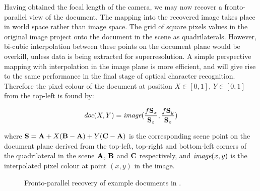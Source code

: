Having obtained the focal length of the camera, we may now recover a fronto-parallel view of the document.  The mapping into the recovered image takes place in world space rather than image space.
The grid of square pixels values in the original image project onto the document in the scene as quadrilaterals.
However, bi-cubic interpolation between these points on the document plane would be overkill,
unless data is being extracted for superresolution.
A simple perspective mapping with interpolation in the image plane is more efficient, and
will give rise to the same performance in the final stage of optical character recognition.
Therefore the pixel colour of the document at position $X \in [0,1]$, $Y \in [0,1]$ from the top-left is found by:

\begin{equation}
\mbox{\em doc}(X,Y) = \mbox{\em image}(\frac{f{ \bf S }_x}{{ \bf S }_z},\frac{f{ \bf S }_y}{{ \bf S }_z})
\end{equation}


where
${ \bf S } = { \bf A } + X ( { \bf B }-{ \bf A } ) + Y ( { \bf C }-{ \bf A } )$
is the corresponding scene point on the document plane
derived from the top-left, top-right and bottom-left corners of the
quadrilateral in the scene ${ \bf A }$, ${ \bf B }$ and ${ \bf C }$
respectively, and $\mbox{\em image}(x,y)$ is the interpolated pixel colour at point $(x,y)$ in the image.

\begin{figure}[t]
\centering
\begin{center}
\hspace{2mm}
\end{center}
\caption{Fronto-parallel recovery of example documents in .}
\label{pprecover}
\end{figure}

